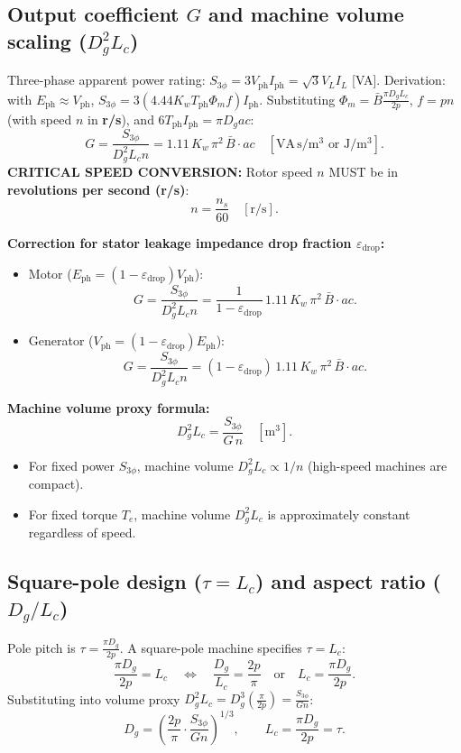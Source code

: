 \subsection{Output coefficient $G$ and machine volume scaling ($D_g^2 L_c$)}
Three-phase apparent power rating: $S_{3\phi} = 3 V_{\mathrm{ph}} I_{\mathrm{ph}} = \sqrt{3} V_L I_L$ [VA].
Derivation: with $E_{\mathrm{ph}} \approx V_{\mathrm{ph}}$, $S_{3\phi} = 3(4.44 K_w T_{\mathrm{ph}} \Phi_m f)I_{\mathrm{ph}}$.
Substituting $\Phi_m = \bar{B}\frac{\pi D_g L_c}{2p}$, $f = p n$ (with speed $n$ in \textbf{r/s}), and $6 T_{\mathrm{ph}} I_{\mathrm{ph}} = \pi D_g ac$:
\[
\boxed{G = \frac{S_{3\phi}}{D_g^2 L_c n} = 1.11\,K_w\,\pi^2\,\bar{B}\cdot ac}\quad[\mathrm{VA\,s/m^3}\text{ or }\mathrm{J/m^3}].
\]
\textbf{CRITICAL SPEED CONVERSION:} Rotor speed $n$ MUST be in \textbf{revolutions per second (r/s)}:
\[
n = \frac{n_s}{60}\quad[\mathrm{r/s}].
\]

\textbf{Correction for stator leakage impedance drop fraction $\varepsilon_{\mathrm{drop}}$:}
\begin{itemize}
  \item Motor ($E_{\mathrm{ph}} = (1-\varepsilon_{\mathrm{drop}})V_{\mathrm{ph}}$):
  \[
  G = \frac{S_{3\phi}}{D_g^2 L_c n} = \frac{1}{1-\varepsilon_{\mathrm{drop}}}\,1.11\,K_w\,\pi^2\,\bar{B}\cdot ac.
  \]
  \item Generator ($V_{\mathrm{ph}} = (1-\varepsilon_{\mathrm{drop}})E_{\mathrm{ph}}$):
  \[
  G = \frac{S_{3\phi}}{D_g^2 L_c n} = (1-\varepsilon_{\mathrm{drop}})\,1.11\,K_w\,\pi^2\,\bar{B}\cdot ac.
  \]
\end{itemize}

\textbf{Machine volume proxy formula:}
\[
\boxed{D_g^2 L_c = \frac{S_{3\phi}}{G\,n}}\quad[\mathrm{m^3}].
\]
\begin{itemize}
  \item For fixed power $S_{3\phi}$, machine volume $D_g^2 L_c \propto 1/n$ (high-speed machines are compact).
  \item For fixed torque $T_e$, machine volume $D_g^2 L_c$ is approximately constant regardless of speed.
\end{itemize}

\subsection{Square-pole design ($\tau = L_c$) and aspect ratio ($D_g/L_c$)}
Pole pitch is $\tau = \frac{\pi D_g}{2p}$. A square-pole machine specifies $\tau = L_c$:
\[
\frac{\pi D_g}{2p} = L_c
\quad\iff\quad
\boxed{\frac{D_g}{L_c} = \frac{2p}{\pi}}
\quad\text{or}\quad
\boxed{L_c = \frac{\pi D_g}{2p}}.
\]
Substituting into volume proxy $D_g^2 L_c = D_g^3\left(\frac{\pi}{2p}\right) = \frac{S_{3\phi}}{G n}$:
\[
\boxed{D_g = \left(\frac{2p}{\pi}\cdot\frac{S_{3\phi}}{G n}\right)^{1/3}},
\qquad
\boxed{L_c = \frac{\pi D_g}{2p} = \tau}.
\]

